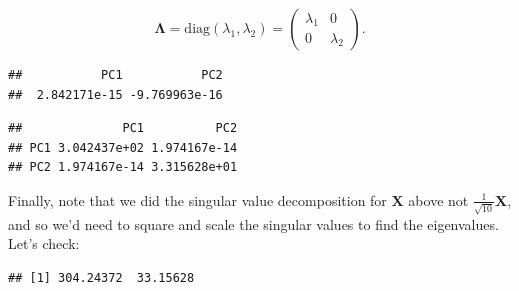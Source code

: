 \documentclass[
]{book}
\newenvironment{Shaded}{\begin{snugshade}}{\end{snugshade}}
\newcommand{\CommentTok}[1]{\textcolor[rgb]{0.56,0.35,0.01}{\textit{#1}}}
\newcommand{\DecValTok}[1]{\textcolor[rgb]{0.00,0.00,0.81}{#1}}
\newcommand{\FunctionTok}[1]{\textcolor[rgb]{0.00,0.00,0.00}{#1}}
\newcommand{\NormalTok}[1]{#1}
\newcommand{\SpecialCharTok}[1]{\textcolor[rgb]{0.00,0.00,0.00}{#1}}
\theoremstyle{definition}
\theoremstyle{definition}
\theoremstyle{definition}
\theoremstyle{definition}
\theoremstyle{remark}
\begin{document}
\[
\boldsymbol \Lambda= \text{diag}(\lambda_1,\lambda_2) =  \begin{pmatrix} \lambda_1 & 0 \\ 0 & \lambda_2 \end{pmatrix}.
\]

\begin{Shaded}
\end{Shaded}

\begin{verbatim}
##           PC1           PC2 
##  2.842171e-15 -9.769963e-16
\end{verbatim}

\begin{Shaded}
\end{Shaded}

\begin{verbatim}
##              PC1          PC2
## PC1 3.042437e+02 1.974167e-14
## PC2 1.974167e-14 3.315628e+01
\end{verbatim}

Finally, note that we did the singular value decomposition for \(\mathbf X\) above not \(\frac{1}{\sqrt{10}}\mathbf X\), and so we'd need to square and scale the singular values to find the eigenvalues. Let's check:

\begin{Shaded}
\end{Shaded}

\begin{verbatim}
## [1] 304.24372  33.15628
\end{verbatim}

\begin{Shaded}
\end{Shaded}
\end{document}
